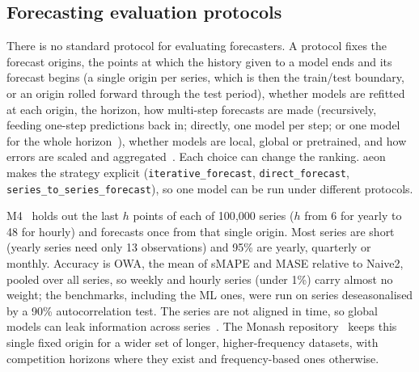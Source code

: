 
\subsection{Forecasting evaluation protocols}
\label{sec:protocols}

There is no standard protocol for evaluating forecasters. A protocol fixes the
forecast origins, the points at which the history given to a model ends and
its forecast begins (a single origin per series, which is then the train/test
boundary, or an origin rolled forward through the test period), whether models
are refitted at each origin, the horizon, how multi-step forecasts are made
(recursively, feeding one-step predictions back in; directly, one model per
step; or one model for the whole horizon~\citep{taieb2012review}), whether
models are local, global or pretrained, and how errors are scaled and
aggregated~\citep{tashman2000outofsample,hewamalage2023forecast}. Each choice
can change the ranking. aeon makes the strategy explicit
(\texttt{iterative\_forecast}, \texttt{direct\_forecast},
\texttt{series\_to\_series\_forecast}), so one model can be run under different
protocols.

M4~\citep{makridakis2020m4} holds out the last $h$ points of each of 100{,}000
series ($h$ from 6 for yearly to 48 for hourly) and forecasts once from that
single origin. Most series are short (yearly series need only 13 observations)
and 95\% are yearly, quarterly or monthly. Accuracy is OWA, the mean of sMAPE
and MASE relative to Naive2, pooled over all series, so weekly and hourly
series (under 1\%) carry almost no weight; the benchmarks, including the ML
ones, were run on series deseasonalised by a 90\% autocorrelation test. The
series are not aligned in time, so global models can leak information across
series~\citep{ingel2020correlated}. The Monash
repository~\citep{godahewa2021monash} keeps this single fixed origin for a
wider set of longer, higher-frequency datasets, with competition horizons where
they exist and frequency-based ones otherwise.

